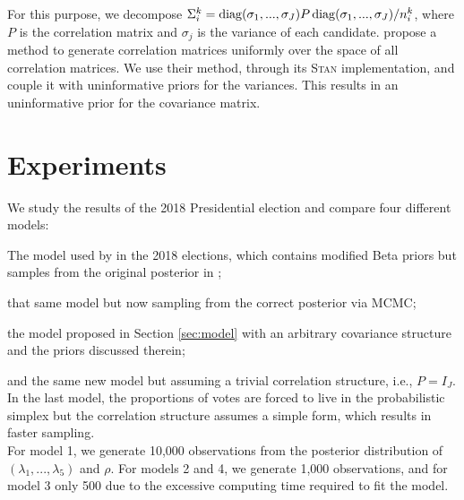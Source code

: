 \documentclass{article}
\begin{document}
For this purpose, we decompose $\Sigma_i^k = \operatorname{diag}(\sigma_1, ..., \sigma_J) P \operatorname{diag}(\sigma_1, ..., \sigma_J) / n_i^k$, where $P$ is the correlation matrix and $\sigma_j$ is the variance of each candidate. \citet{lewandowski2009} propose a method to generate correlation matrices uniformly over the space of all correlation matrices. We use their method, through its \textsc{Stan} implementation, and couple it with uninformative priors for the variances. This results in an uninformative prior for the covariance matrix.
\\




\section{Experiments} \label{sec:experiments}


We study the results of the 2018 Presidential election and compare four different models:
\benum
  \item The model used by \citet{diluvi2018} in the 2018 elections, which contains modified Beta priors but samples from the original posterior in \citet{mendoza-nieto2016};
  \item that same model but now sampling from the correct posterior via MCMC;
  \item the model proposed in Section \ref{sec:model} with an arbitrary covariance structure and the priors discussed therein;
  \item and the same new model but assuming a trivial correlation structure, i.e., $P = I_J$.
\eenum
In the last model, the proportions of votes are forced to live in the probabilistic simplex but the correlation structure assumes a simple form, which results in faster sampling. \\

For model 1, we generate 10,000 observations from the posterior distribution of $(\lambda_1, ..., \lambda_5)$ and $\rho$. For models 2 and 4, we generate 1,000 observations, and for model 3 only 500 due to the excessive computing time required to fit the model. \\
\end{document}
